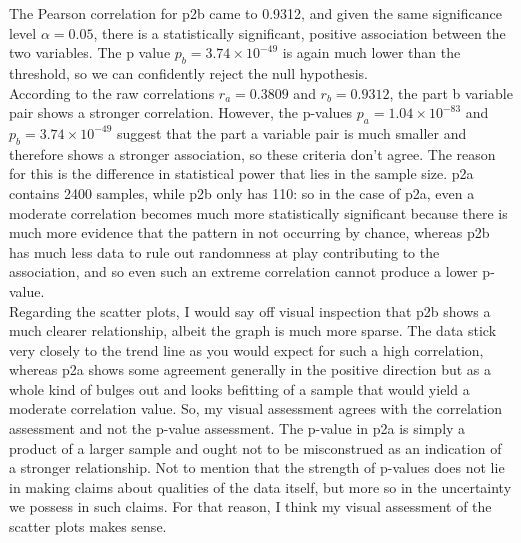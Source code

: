 The Pearson correlation for p2b came to 0.9312, and given the same significance level $ \alpha = 0.05 $, there is a statistically significant, positive association between the two variables. The p value $ p_b =  3.74 \times 10^{-49} $ is again much lower than the threshold, so we can confidently reject the null hypothesis.\\

According to the raw correlations $ r_a = 0.3809 $ and $ r_b = 0.9312 $, the part b variable pair shows a stronger correlation. However, the p-values $ p_a =  1.04 \times 10^{-83} $ and $ p_b =  3.74 \times 10^{-49} $ suggest that the part a variable pair is much smaller and therefore shows a stronger association, so these criteria don't agree. The reason for this is the difference in statistical power that lies in the sample size. p2a contains 2400 samples, while p2b only has 110: so in the case of p2a, even a moderate correlation becomes much more statistically significant because there is much more evidence that the pattern in not occurring by chance, whereas p2b has much less data to rule out randomness at play contributing to the association, and so even such an extreme correlation cannot produce a lower p-value.\\

Regarding the scatter plots, I would say off visual inspection that p2b shows a much clearer relationship, albeit the graph is much more sparse. The data stick very closely to the trend line as you would expect for such a high correlation, whereas p2a shows some agreement generally in the positive direction but as a whole kind of bulges out and looks befitting of a sample that would yield a moderate correlation value. So, my visual assessment agrees with the correlation assessment and not the p-value assessment. The p-value in p2a is simply a product of a larger sample and ought not to be misconstrued as an indication of a stronger relationship. Not to mention that the strength of p-values does not lie in making claims about qualities of the data itself, but more so in the uncertainty we possess in such claims. For that reason, I think my visual assessment of the scatter plots makes sense.

\newpage
